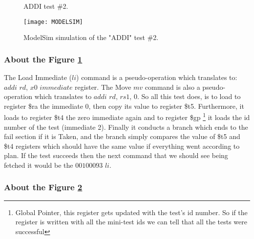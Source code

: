\begin{figure}[h!]
	\begin{center}
		\caption{ADDI test \#2.}
		\label{Image4.1}
	\end{center}
\end{figure}

\clearpage

\begin{figure}[h!]
	\begin{center}
		\texttt{[image: MODELSIM]}
		\caption{ModelSim simulation of the "ADDI" test \#2.}
		\label{Image4.2}
	\end{center}
\end{figure}

\clearpage
\subsubsection{About the Figure \ref{Image4.1}}
The Load Immediate ($li$) command is a pseudo-operation which translates to: $addi$ $rd$, $x0$ $immediate$ register. The Move $mv$ command is also a pseudo-operation which translates to $addi$ $rd$, $rs1$, $0$. So all this test does, is to load to register \$ra the immediate 0, then copy its value to register \$t5. Furthermore, it loads to register \$t4 the zero immediate again and to register \$gp \footnote{Global Pointer, this register gets updated with the test's id number. So if the register is written with all the mini-test ids we can tell that all the tests were successful} it loads the id number of the test (immediate 2). Finally it conducts a branch which ends to the fail section if it is Taken, and the branch simply compares the value of \$t5 and \$t4 registers which should have the same value if everything went according to plan. If the test succeeds then the next command that we should see being fetched it would be the $00100093$ $li$. 

\subsubsection{About the Figure \ref{Image4.2}}

